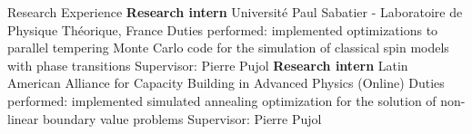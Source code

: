 \begin{rubric}{Research Experience}
\textbf{Research intern} \newline
Université Paul Sabatier - Laboratoire de Physique Théorique, France \newline
Duties performed: implemented optimizations to parallel tempering Monte Carlo code for the simulation of classical spin models with phase transitions \newline
Supervisor: Pierre Pujol
%
\textbf{Research intern} \newline 
Latin American Alliance for Capacity Building in Advanced Physics (Online)\newline
Duties performed: implemented simulated annealing optimization for the solution of non-linear boundary value problems \newline
Supervisor: Pierre Pujol
%

%
%
%
\end{rubric}